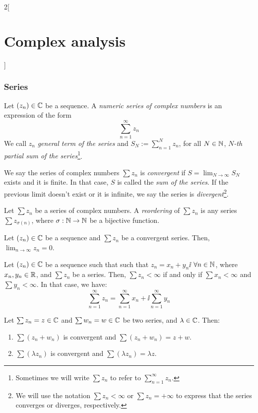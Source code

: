 \documentclass[../../../main_math.tex]{subfiles}
\begin{document}
\begin{multicols}{2}[\section{Complex analysis}]
  \subsubsection{Series}
  \begin{definition}
    Let $(z_n)\in\mathbb{C}$ be a sequence. A \emph{numeric series of complex numbers} is an expression of the form $$\sum_{n=1}^\infty z_n$$ We call $z_n$ \emph{general term of the series} and $\displaystyle S_N:=\sum_{n=1}^N z_n$, for all $N\in\mathbb{N} $, \emph{$N$-th partial sum of the series}\footnote{Sometimes we will write $\sum z_n$ to refer to $\displaystyle\sum_{n=1}^\infty z_n$.}.
  \end{definition}
  \begin{definition}
    We say the series of complex numbers $\sum z_n$ is \emph{convergent} if $\displaystyle S=\lim_{N\to\infty}S_N$ exists and it is finite. In that case, $S$ is called the \emph{sum of the series}. If the previous limit doesn't exist or it is infinite, we say the series is \emph{divergent}\footnote{We will use the notation $\sum z_n<\infty$ or $\sum z_n=+\infty$ to express that the series converges or diverges, respectively.}.
  \end{definition}
  \begin{definition}
    Let $\sum z_n$ be a series of complex numbers. A \emph{reordering} of $\sum z_n$ is any series $\sum z_{\sigma(n)}$, where $\sigma:\mathbb{N}\rightarrow\mathbb{N}$ be a bijective function.
  \end{definition}
  \begin{proposition}
    Let $(z_n)\in\mathbb{C}$ be a sequence and $\sum z_n$ be a convergent series. Then, $\displaystyle\lim_{n\to\infty}z_n =0$.
  \end{proposition}
  \begin{proposition}
    Let $(z_n)\in\mathbb{C}$ be a sequence such that such that $z_n=x_n+y_n\ii$ $\forall n\in\mathbb{N}$, where $x_n,y_n\in\mathbb{R}$, and $\sum z_n$ be a series. Then, $\sum z_n<\infty$ if and only if $\sum x_n<\infty$ and $\sum y_n<\infty$. In that case, we have: $$\sum_{n=1}^\infty z_n=\sum_{n=1}^\infty x_n+\ii\sum_{n=1}^\infty y_n$$
  \end{proposition}
  \begin{proposition}
    Let $\sum z_n=z\in\mathbb{C}$ and $\sum w_n=w\in\mathbb{C}$ be two series, and $\lambda\in\mathbb{C}$. Then:
    \begin{enumerate}
      \item $\sum (z_n+w_n)$ is convergent and $\sum (z_n+w_n)=z+w$.
      \item $\sum (\lambda z_n)$ is convergent and $\sum (\lambda z_n)=\lambda z$.

\end{enumerate}
\end{proposition}
\end{multicols}
\end{document}
